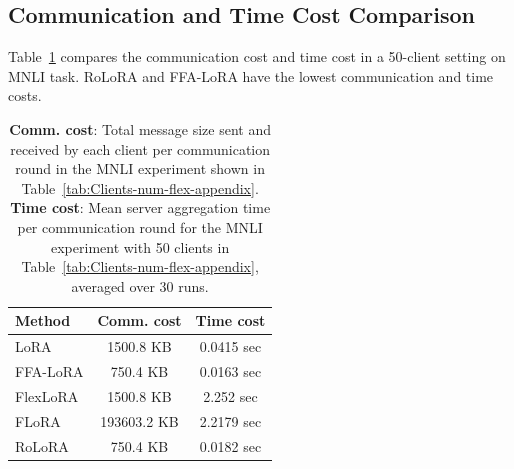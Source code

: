 \documentclass{article}
\theoremstyle{plain}
\theoremstyle{definition}
\theoremstyle{remark}
\begin{document}
\subsection{Communication and Time Cost Comparison}

Table~\ref{tab:comm-time-cost-comp} compares the communication cost and time cost in a 50-client setting on MNLI task. RoLoRA and FFA-LoRA have the lowest communication and time costs. 
\begin{table}[htbp]
\centering
{\footnotesize
\begin{tabular}{lcc}
\toprule
Method    & Comm. cost & Time cost \\
\midrule
LoRA      & 1500.8 KB   & 0.0415 sec \\
FFA-LoRA  & 750.4 KB    & 0.0163 sec \\
FlexLoRA  & 1500.8 KB   & 2.252 sec \\
FLoRA     & 193603.2 KB & 2.2179 sec \\
\rowcolor{ours}RoLoRA    & 750.4 KB    & 0.0182 sec \\
\bottomrule
\end{tabular}}
\vspace{4pt}
\captionsetup{justification=justified}
\caption{Communication and Time Cost Comparison}
\caption*{\textbf{Comm. cost}: Total message size sent and received by each client per communication round in the MNLI experiment shown in Table~\ref{tab:Clients-num-flex-appendix}. \\
\textbf{Time cost}: Mean server aggregation time per communication round for the MNLI experiment with 50 clients in Table~\ref{tab:Clients-num-flex-appendix}, averaged over 30 runs.}
\label{tab:comm-time-cost-comp}
\end{table}
\end{document}
